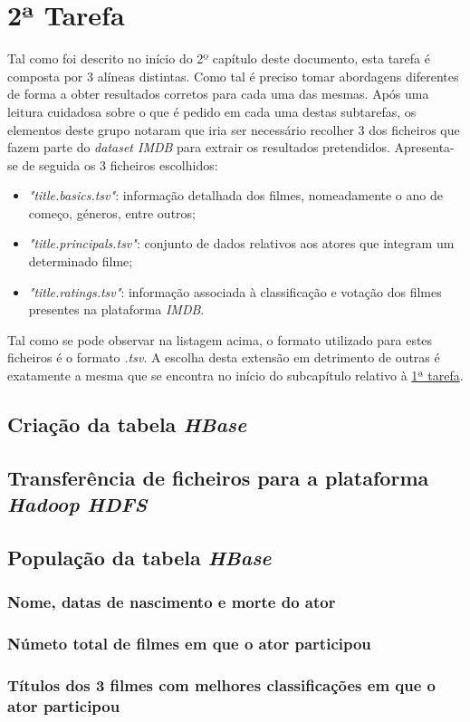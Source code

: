 \documentclass[a4paper]{report}
\begin{document}
{	\section{2ª Tarefa} \label{sec:Task2}
	Tal como foi descrito no início do 2º capítulo deste documento, esta tarefa é composta por 3 alíneas distintas. Como tal é preciso tomar abordagens diferentes de forma a obter resultados corretos para cada uma das mesmas. 
	Após uma leitura cuidadosa sobre o que é pedido em cada uma destas subtarefas, os elementos deste grupo notaram que iria ser necessário recolher 3 dos ficheiros que fazem parte do \textit{dataset IMDB} para extrair os resultados pretendidos.
	Apresenta-se de seguida os 3 ficheiros escolhidos:
	\begin{itemize}
		\item \textit{"title.basics.tsv"}: informação detalhada dos filmes, nomeadamente o ano de começo, géneros, entre outros;
		\item \textit{"title.principals.tsv"}: conjunto de dados relativos aos atores que integram um determinado filme;
		\item \textit{"title.ratings.tsv"}: informação associada à classificação e votação dos filmes presentes na plataforma \textit{IMDB}.
	\end{itemize}
	
	Tal como se pode observar na listagem acima, o formato utilizado para estes ficheiros é o formato \textit{.tsv}. A escolha desta extensão em detrimento de outras é exatamente a mesma que se encontra no início do subcapítulo relativo à \hyperref[sec:Task1]{1ª tarefa}.
		
		\subsection{Criação da tabela \textit{HBase}} \label{subsec:Task2-1}

		\subsection{Transferência de ficheiros para a plataforma \textit{Hadoop HDFS}} \label{subsec:Task2-2}

		\subsection{População da tabela \textit{HBase}} \label{subsec:Task2-3}
			\subsubsection{Nome, datas de nascimento e morte do ator} \label{sssec:Task2-3-1}

			\subsubsection{Númeto total de filmes em que o ator participou} \label{sssec:Task2-3-2}

			\subsubsection{Títulos dos 3 filmes com melhores classificações em que o ator participou} \label{sssec:Task2-3-3}
}
\end{document}
